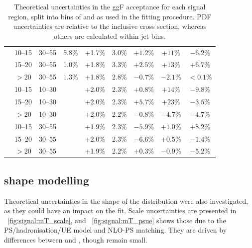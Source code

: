 \begin{table}
\begin{tabular}{ccc|cccccc}
		& 10--15 & 30--55 & 5.8\% & +1.7\% & 3.0\% & $+1.2\%$ & $+11\%$  & $-6.2\%$ \\
		& 15--20 & 30--55 & 1.0\% & +1.8\% & 3.3\% & $+2.5\%$ & $+13\%$  & $+6.7\%$  \\
		&  $>20$ & 30--55 & 1.3\% & +1.8\% & 2.8\% & $-0.7\%$ & $-2.1\%$ & $<0.1\%$ \\
		\midrule
		\multirow{6}{*}{\twojet}
	    & 10--15 & 10--30 &       & +2.0\% & 2.3\% & $+0.8\%$ & $+14\%$  & $-9.8\%$ \\
		& 15--20 & 10--30 &       & +2.0\% & 2.3\% & $+5.7\%$ & $+23\%$  & $-3.5\%$  \\
		&  $>20$ & 10--30 &       & +2.0\% & 2.2\% & $-0.8\%$ & $-4.7\%$ & $-4.7\%$ \\
		& 10--15 & 30--55 &       & +1.9\% & 2.3\% & $-5.9\%$ & $+1.0\%$ & $+8.2\%$ \\
		& 15--20 & 30--55 &       & +2.0\% & 2.3\% & $-6.6\%$ & $+0.5\%$ & $-1.4\%$ \\
		&  $>20$ & 30--55 &       & +1.9\% & 2.2\% & $+0.3\%$ & $-0.9\%$ & $-5.2\%$ \\
		\bottomrule
	\end{tabular}
	\caption{Theoretical uncertainties in the ggF acceptance for each signal region, 
	split into bins of \ptsubleadlep and \mll as used in the fitting procedure. PDF 
	uncertainties are relative to the inclusive cross section, whereas others are 
	calculated within jet bins.}
	\label{tab:signal:acc_unc_binned}
\end{table}



\subsection{\mt shape modelling}

Theoretical uncertainties in the shape of the \mt distribution were also investigated, 
as they could have an impact on the fit. Scale uncertainties are presented in 
\Figure~\ref{fig:signal:mT_scale}, and \Figure~\ref{fig:signal:mT_psue} shows those due 
to the PS/hadronisation/UE model and NLO-PS matching. They are driven by differences 
between  and \fherwig, though remain small.

